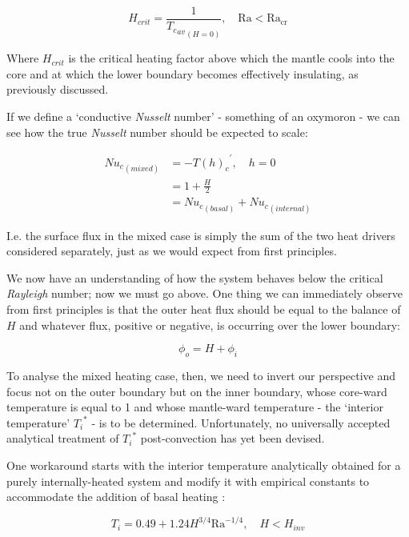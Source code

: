 \documentclass[a4paper,11pt,oneside]{book}
\begin{document}
\begin{equation}
H_{crit} = \frac{1}{{{T_{c}}_{av}}_{(H=0)}}, \quad \mathrm{Ra} < {\mathrm{Ra}}_{\mathrm{cr}}
\end{equation}

Where $H_{crit}$ is the critical heating factor above which the mantle cools into the core and at which the lower boundary becomes effectively insulating, as previously discussed.

If we define a `conductive \textit{Nusselt} number' - something of an oxymoron - we can see how the true \textit{Nusselt} number should be expected to scale:

\begin{align*}
{{Nu}_{c}}_{(mixed)} &= -{{T(h)}_{c}}^{'}, \quad h = 0 \\
&= 1 + \frac{H}{2} \\
&= {{Nu}_{c}}_{(basal)} + {{Nu}_{c}}_{(internal)}
\end{align*}

I.e. the surface flux in the mixed case is simply the sum of the two heat drivers considered separately, just as we would expect from first principles.

We now have an understanding of how the system behaves below the critical \textit{Rayleigh} number; now we must go above. One thing we can immediately observe from first principles is that the outer heat flux should be equal to the balance of $H$ and whatever flux, positive or negative, is occurring over the lower boundary:

\begin{equation}
{\phi}_o = H + {\phi}_i
\end{equation}

To analyse the mixed heating case, then, we need to invert our perspective and focus not on the outer boundary but on the inner boundary, whose core-ward temperature is equal to 1 and whose mantle-ward temperature - the `interior temperature' ${T_i}^{*}$ - is to be determined. Unfortunately, no universally accepted analytical treatment of ${T_i}^{*}$ post-convection has yet been devised.

One workaround starts with the interior temperature analytically obtained for a purely internally-heated system and modify it with empirical constants to accommodate the addition of basal heating \cite{Moore2008-je}:

\begin{equation}
T_i = 0.49 + 1.24 H^{3/4} {\mathrm{Ra}}^{-1/4}, \quad H < H_{inv}
\end{equation}
\end{document}
